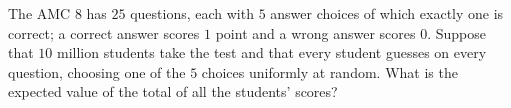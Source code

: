 The AMC 8 has $25$ questions, each with $5$ answer choices of which exactly one is correct; a correct answer scores $1$ point and a wrong answer scores $0$. Suppose that $10$ million students take the test and that every student guesses on every question, choosing one of the $5$ choices uniformly at random. What is the expected value of the total of all the students' scores?
